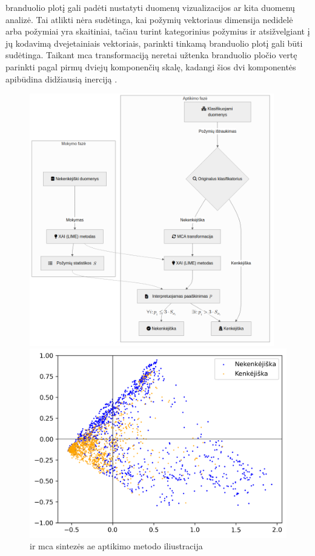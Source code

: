 \LIME branduolio plotį  gali padėti nustatyti duomenų vizualizacijos ar kita duomenų analizė. Tai atlikti nėra sudėtinga, kai požymių vektoriaus dimensija nedidelė arba požymiai yra skaitiniai, tačiau turint kategorinius požymius ir atsižvelgiant į jų kodavimą dvejetainiais vektoriais, parinkti tinkamą \LIME branduolio plotį gali būti sudėtinga. Taikant \gls{mca} transformaciją neretai užtenka branduolio pločio vertę parinkti pagal pirmų dviejų komponenčių skalę, kadangi šios dvi komponentės apibūdina didžiausią inerciją .

\begin{figure}[h]
    \captionsetup{justification=centering}
    \begin{minipage}{0.48\textwidth}
        \includegraphics[width=0.95\textwidth]{images/original.png}
        \caption{\LIME ir \gls{mca} sintezės \gls{ae} aptikimo metodo iliustracija}
        \label{fig:original}
    \end{minipage}
    \begin{minipage}{0.48\textwidth}
        \centering
        \includegraphics[width=\textwidth]{images/mca_scatter.png}

\end{minipage}
\end{figure}
